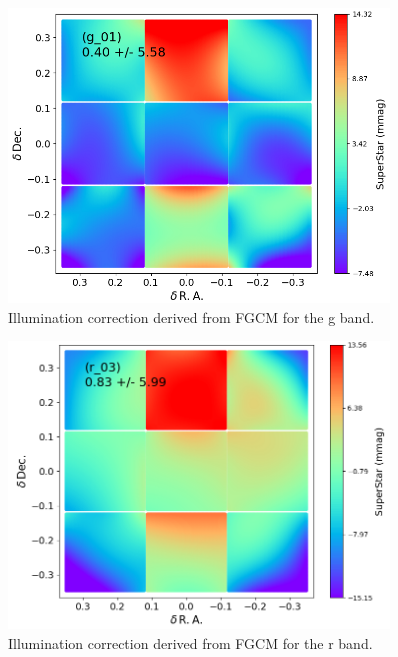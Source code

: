 \begin{figure}
  \begin{center}
    \includegraphics[width=0.9\textwidth]{photometric_calibration_figures/illumcorr_g.png}
  \end{center}
  \caption{Illumination correction derived from FGCM for the g band.}
\end{figure}

\begin{figure}
  \begin{center}
    \includegraphics[width=0.9\textwidth]{photometric_calibration_figures/illumcorr_r.png}
  \end{center}
  \caption{Illumination correction derived from FGCM for the r band.}
\end{figure}

